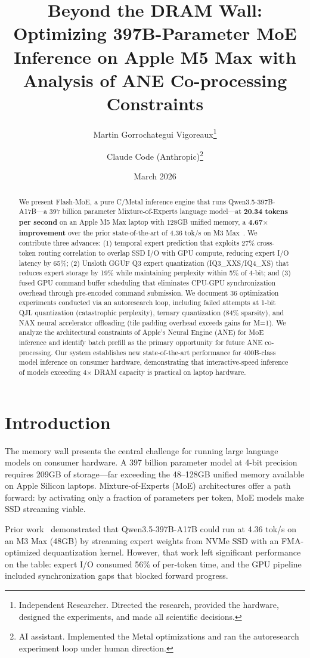 \documentclass[11pt,twocolumn]{article}
\title{Beyond the DRAM Wall: Optimizing 397B-Parameter MoE Inference on Apple M5 Max with Analysis of ANE Co-processing Constraints}
\author{
    Martin Gorrochategui Vigoreaux\thanks{Independent Researcher. Directed the research, provided the hardware, designed the experiments, and made all scientific decisions.} \and
    Claude Code (Anthropic)\thanks{AI assistant. Implemented the Metal optimizations and ran the autoresearch experiment loop under human direction.}
}
\date{March 2026}
\begin{document}
\maketitle

\begin{abstract}
We present Flash-MoE, a pure C/Metal inference engine that runs Qwen3.5-397B-A17B---a 397 billion parameter Mixture-of-Experts language model---at \textbf{20.34 tokens per second} on an Apple M5 Max laptop with 128GB unified memory, a \textbf{4.67$\times$ improvement} over the prior state-of-the-art of 4.36 tok/s on M3 Max~\cite{flashmoe2025}. We contribute three advances: (1) temporal expert prediction that exploits 27\% cross-token routing correlation to overlap SSD I/O with GPU compute, reducing expert I/O latency by 65\%; (2) Unsloth GGUF Q3 expert quantization (IQ3\_XXS/IQ4\_XS) that reduces expert storage by 19\% while maintaining perplexity within 5\% of 4-bit; and (3) fused GPU command buffer scheduling that eliminates CPU-GPU synchronization overhead through pre-encoded command submission. We document 36 optimization experiments conducted via an autoresearch loop, including failed attempts at 1-bit QJL quantization (catastrophic perplexity), ternary quantization (84\% sparsity), and NAX neural accelerator offloading (tile padding overhead exceeds gains for M=1). We analyze the architectural constraints of Apple's Neural Engine (ANE) for MoE inference and identify batch prefill as the primary opportunity for future ANE co-processing. Our system establishes new state-of-the-art performance for 400B-class model inference on consumer hardware, demonstrating that interactive-speed inference of models exceeding 4$\times$ DRAM capacity is practical on laptop hardware.
\end{abstract}

\section{Introduction}

The memory wall presents the central challenge for running large language models on consumer hardware. A 397 billion parameter model at 4-bit precision requires 209GB of storage---far exceeding the 48--128GB unified memory available on Apple Silicon laptops. Mixture-of-Experts (MoE) architectures offer a path forward: by activating only a fraction of parameters per token, MoE models make SSD streaming viable.

Prior work~\cite{flashmoe2025} demonstrated that Qwen3.5-397B-A17B could run at 4.36 tok/s on an M3 Max (48GB) by streaming expert weights from NVMe SSD with an FMA-optimized dequantization kernel. However, that work left significant performance on the table: expert I/O consumed 56\% of per-token time, and the GPU pipeline included synchronization gaps that blocked forward progress.
\end{document}
